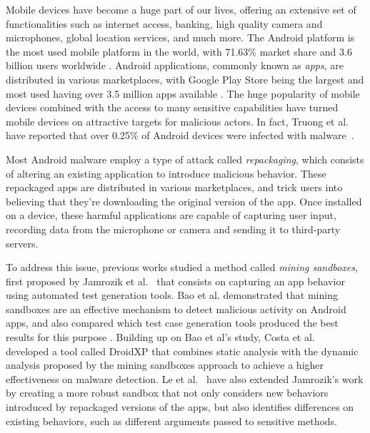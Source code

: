 Mobile devices have become a huge part of our lives, offering an extensive set of functionalities such as internet access, banking, high quality camera and microphones, global location services, and much more. The Android platform is the most used mobile platform in the world, with 71.63\% market share and 3.6 billion users worldwide \cite{turner_how_nodate}. Android applications, commonly known as \textit{apps}, are distributed in various marketplaces, with Google Play Store being the largest and most used having over 3.5 million apps available \cite{turner_how_nodate-1}. The huge popularity of mobile devices combined with the access to many sensitive capabilities have turned mobile devices on attractive targets for malicious actors. In fact, Truong et al. have reported that over 0.25\% of Android devices were infected with malware~\cite{truong_company_2014}.

Most Android malware employ a type of attack called \textit{repackaging}, which consists of altering an existing application to introduce malicious behavior. These repackaged apps are distributed in various marketplaces, and trick users into believing that they're downloading the original version of the app. Once installed on a device, these harmful applications are capable of capturing user input, recording data from the microphone or camera and sending it to third-party servers.

To address this issue, previous works studied a method called \textit{mining sandboxes}, first proposed by Jamrozik et al.~\cite{jamrozik_mining_2016} that consists on capturing an app behavior using automated test generation tools. Bao et al. demonstrated that mining sandboxes are an effective mechanism to detect malicious activity on Android apps, and also compared which test case generation tools produced the best results for this purpose \cite{bao_mining_2018}. Building up on Bao et al's study, Costa et al.~\cite{costa_exploring_2022} developed a tool called DroidXP that combines static analysis with the dynamic analysis proposed by the mining sandboxes approach to achieve a higher effectiveness on malware detection. Le et al.~\cite{le_towards_2018} have also extended Jamrozik's work by creating a more robust sandbox that not only considers new behaviors introduced by repackaged versions of the apps, but also identifies differences on existing behaviors, such as different arguments passed to sensitive methods.

